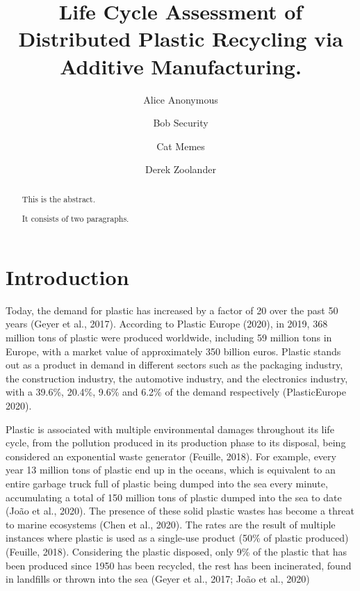 \documentclass[]{elsarticle} %
\begin{document}
\begin{frontmatter}

  \title{Life Cycle Assessment of Distributed Plastic Recycling via Additive Manufacturing.}
    \author[Some Institute of Technology]{Alice Anonymous}
    \author[Another University]{Bob Security}
    \author[Another University]{Cat Memes}
    \author[Some Institute of Technology]{Derek Zoolander}
      \address[Some Institute of Technology]{Department, Street, City, State, Zip}
    \address[Another University]{Department, Street, City, State, Zip}
  
  \begin{abstract}
  This is the abstract.

  It consists of two paragraphs.
  \end{abstract}
  
 \end{frontmatter}

\hypertarget{introduction}{%
\section{Introduction}\label{introduction}}

Today, the demand for plastic has increased by a factor of 20 over the past 50 years (Geyer et al., 2017).
According to Plastic Europe (2020), in 2019, 368 million tons of plastic were produced worldwide, including 59 million tons in Europe, with a market value of approximately 350 billion euros.
Plastic stands out as a product in demand in different sectors such as the packaging industry, the construction industry, the automotive industry, and the electronics industry, with a 39.6\%, 20.4\%, 9.6\% and 6.2\% of the demand respectively (PlasticEurope 2020).

Plastic is associated with multiple environmental damages throughout its life cycle, from the pollution produced in its production phase to its disposal, being considered an exponential waste generator (Feuille, 2018).
For example, every year 13 million tons of plastic end up in the oceans, which is equivalent to an entire garbage truck full of plastic being dumped into the sea every minute, accumulating a total of 150 million tons of plastic dumped into the sea to date (João et al., 2020).
The presence of these solid plastic wastes has become a threat to marine ecosystems (Chen et al., 2020).
The rates are the result of multiple instances where plastic is used as a single-use product (50\% of plastic produced) (Feuille, 2018).
Considering the plastic disposed, only 9\% of the plastic that has been produced since 1950 has been recycled, the rest has been incinerated, found in landfills or thrown into the sea (Geyer et al., 2017; João et al., 2020)
\end{document}
